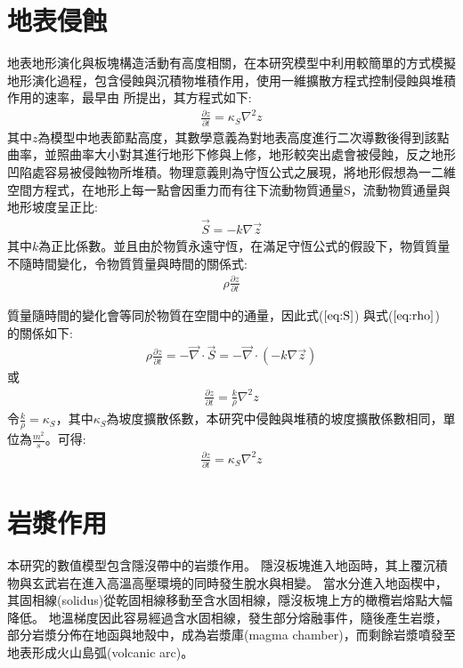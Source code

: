 \section{地表侵蝕}
地表地形演化與板塊構造活動有高度相關，在本研究模型中利用較簡單的方式模擬地形演化過程，包含侵蝕與沉積物堆積作用，使用一維擴散方程式控制侵蝕與堆積作用的速率，最早由\citealp{culling1960analytical} 所提出，其方程式如下:
\begin{align}
\frac{\partial z}{\partial t} = \kappa_S \nabla^2 z \label{eq:erosion}
\end{align}
其中$z$為模型中地表節點高度，其數學意義為對地表高度進行二次導數後得到該點曲率，並照曲率大小對其進行地形下修與上修，地形較突出處會被侵蝕，反之地形凹陷處容易被侵蝕物所堆積。物理意義則為守恆公式之展現，將地形假想為一二維空間方程式，在地形上每一點會因重力而有往下流動物質通量S，流動物質通量與地形坡度呈正比:
\begin{align}
\vec S = -k\nabla \vec z \label{eq:S}
\end{align}
其中$k$為正比係數。並且由於物質永遠守恆，在滿足守恆公式的假設下，物質質量不隨時間變化，令物質質量與時間的關係式:
\begin{align}
\rho\frac{\partial z}{\partial t}\label{eq:rho}
\end{align}

質量隨時間的變化會等同於物質在空間中的通量，因此式($\ref{eq:S}$) 與式($\ref{eq:rho}$) 的關係如下:
\begin{align}
\rho\frac{\partial z}{\partial t} = -\vec\nabla\cdot \vec S = -\vec\nabla \cdot (-k\nabla \vec z)\label{eq:erosion2}
\end{align}
或
\begin{align}
\frac{\partial z}{\partial t} = \frac{k}{\rho}\nabla^2 z\label{eq:erosion3}
\end{align}
令$\frac{k}{\rho}=\kappa_S$，其中$\kappa_S$為坡度擴散係數，本研究中侵蝕與堆積的坡度擴散係數相同，單位為$\frac{m^2}{s}$。可得:
\begin{align}
\frac{\partial z}{\partial t} = \kappa_S\nabla^2 z\label{eq:erosion4}
\end{align}

\section{岩漿作用}\label{岩漿作用}
本研究的數值模型包含隱沒帶中的岩漿作用。
隱沒板塊進入地函時，其上覆沉積物與玄武岩在進入高溫高壓環境的同時發生脫水與相變。
當水分進入地函楔中，其固相線(solidus)從乾固相線移動至含水固相線，隱沒板塊上方的橄欖岩熔點大幅降低。
地溫梯度因此容易經過含水固相線，發生部分熔融事件，隨後產生岩漿，部分岩漿分佈在地函與地殼中，成為岩漿庫(magma chamber)，而剩餘岩漿噴發至地表形成火山島弧(volcanic arc)。

